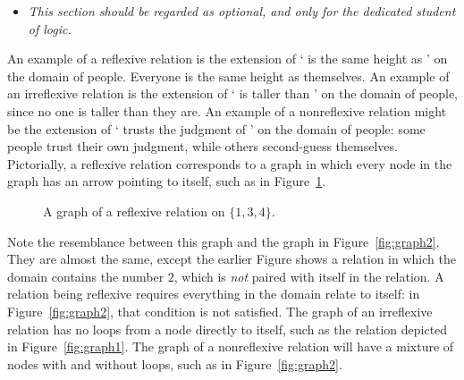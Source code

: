 \begin{earg}
\begin{itemize}
 	\item \emph{This section should be regarded as optional, and only for the dedicated student of logic.}
 \end{itemize} 

An example of a reflexive relation is the extension of ` is the same height as ' on the domain of people. Everyone is the same height as themselves. An example of an irreflexive relation is the extension of ` is taller than ' on the domain of people, since no one is taller than they are. An example of a nonreflexive relation might be the extension of ` trusts the judgment of ' on the domain of people: some people trust their own judgment, while others second-guess themselves. Pictorially, a reflexive relation corresponds to a graph in which every node in the graph has an arrow pointing to itself, such as in Figure~\ref{fig:reflex}. 
\begin{figure}[t]
\caption{A graph of a reflexive relation on $\{1, 3, 4\}$.\label{fig:reflex}}
\end{figure} Note the resemblance between this graph and the graph in Figure~\ref{fig:graph2}. They are almost the same, except the earlier Figure shows a relation in which the domain contains the number $2$, which is \emph{not} paired with itself in the relation. A relation being reflexive requires everything in the domain relate to itself: in Figure~\ref{fig:graph2}, that condition is not satisfied.  The graph of an irreflexive relation has no loops from a node directly to itself, such as the relation depicted in Figure~\ref{fig:graph1}. The graph of a nonreflexive relation will have a mixture of nodes with and without loops, such as in Figure~\ref{fig:graph2}.


\end{earg}
